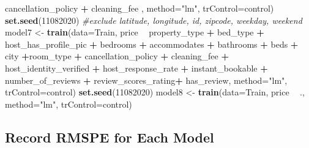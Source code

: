 \documentclass[]{book}
\newenvironment{Shaded}{\begin{snugshade}}{\end{snugshade}}
\newcommand{\KeywordTok}[1]{\textcolor[rgb]{0.13,0.29,0.53}{\textbf{#1}}}
\newcommand{\DataTypeTok}[1]{\textcolor[rgb]{0.13,0.29,0.53}{#1}}
\newcommand{\DecValTok}[1]{\textcolor[rgb]{0.00,0.00,0.81}{#1}}
\newcommand{\StringTok}[1]{\textcolor[rgb]{0.31,0.60,0.02}{#1}}
\newcommand{\CommentTok}[1]{\textcolor[rgb]{0.56,0.35,0.01}{\textit{#1}}}
\newcommand{\OperatorTok}[1]{\textcolor[rgb]{0.81,0.36,0.00}{\textbf{#1}}}
\newcommand{\NormalTok}[1]{#1}
\begin{document}
\begin{Shaded}
\begin{Highlighting}[]
\StringTok{                  }\NormalTok{cancellation_policy }\OperatorTok{+}\StringTok{ }\NormalTok{cleaning_fee ,  }\DataTypeTok{method=}\StringTok{"lm"}\NormalTok{, }\DataTypeTok{trControl=}\NormalTok{control)}
\KeywordTok{set.seed}\NormalTok{(}\DecValTok{11082020}\NormalTok{)}
\CommentTok{#exclude latitude, longitude, id, zipcode, weekday, weekend}
\NormalTok{model7 <-}\StringTok{ }\KeywordTok{train}\NormalTok{(}\DataTypeTok{data=}\NormalTok{Train, price }\OperatorTok{~}\StringTok{ }\NormalTok{property_type }\OperatorTok{+}\StringTok{ }\NormalTok{bed_type }\OperatorTok{+}\StringTok{ }\NormalTok{host_has_profile_pic }\OperatorTok{+}\StringTok{ }\NormalTok{bedrooms }\OperatorTok{+}\StringTok{  }
\StringTok{                  }\NormalTok{accommodates }\OperatorTok{+}\StringTok{ }\NormalTok{bathrooms }\OperatorTok{+}\StringTok{ }\NormalTok{beds }\OperatorTok{+}\StringTok{ }\NormalTok{city }\OperatorTok{+}\NormalTok{room_type }\OperatorTok{+}\StringTok{ }\NormalTok{cancellation_policy }\OperatorTok{+}\StringTok{  }
\StringTok{                  }\NormalTok{cleaning_fee }\OperatorTok{+}\StringTok{ }\NormalTok{host_identity_verified }\OperatorTok{+}\StringTok{ }\NormalTok{host_response_rate }\OperatorTok{+}\StringTok{ }\NormalTok{instant_bookable }\OperatorTok{+}\StringTok{ }
\StringTok{                  }\NormalTok{number_of_reviews }\OperatorTok{+}\StringTok{ }\NormalTok{review_scores_rating}\OperatorTok{+}\StringTok{ }\NormalTok{has_review,  }\DataTypeTok{method=}\StringTok{"lm"}\NormalTok{, }\DataTypeTok{trControl=}\NormalTok{control)}
\KeywordTok{set.seed}\NormalTok{(}\DecValTok{11082020}\NormalTok{)}
\NormalTok{model8 <-}\StringTok{ }\KeywordTok{train}\NormalTok{(}\DataTypeTok{data=}\NormalTok{Train, price }\OperatorTok{~}\StringTok{ }\NormalTok{.,  }\DataTypeTok{method=}\StringTok{"lm"}\NormalTok{, }\DataTypeTok{trControl=}\NormalTok{control)}
\end{Highlighting}
\end{Shaded}

\subsection{Record RMSPE for Each
Model}\label{record-rmspe-for-each-model}
\end{document}
